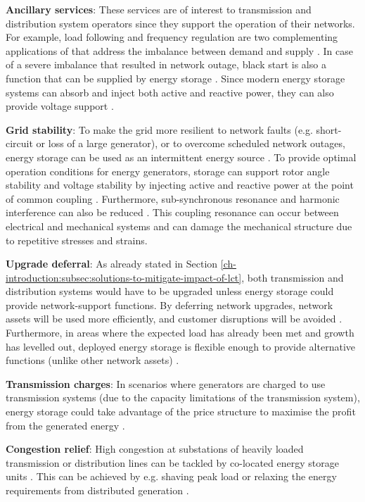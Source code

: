 \textbf{Ancillary services}: These services are of interest to transmission and distribution system operators since they support the operation of their networks.
For example, load following and frequency regulation are two complementing applications of that address the imbalance between demand and supply \cite{Bevrani2011}.
In case of a severe imbalance that resulted in network outage, black start is also a function that can be supplied by energy storage \cite{Cole1995, Kashem2007}.
Since modern energy storage systems can absorb and inject both active and reactive power, they can also provide voltage support \cite{Kulkarni2005}.

\textbf{Grid stability}: To make the grid more resilient to network faults (e.g. short-circuit or loss of a large generator), or to overcome scheduled network outages, energy storage can be used as an intermittent energy source \cite{Kundur1993}.
To provide optimal operation conditions for energy generators, storage can support rotor angle stability and voltage stability by injecting active and reactive power at the point of common coupling \cite{Chakraborty2012, Kolluri2002}.
Furthermore, sub-synchronous resonance and harmonic interference can also be reduced \cite{Wang1994}.
This coupling resonance can occur between electrical and mechanical systems and can damage the mechanical structure due to repetitive stresses and strains.

\textbf{Upgrade deferral}: As already stated in Section \ref{ch-introduction:subsec:solutions-to-mitigate-impact-of-lct}, both transmission and distribution systems would have to be upgraded unless energy storage could provide network-support functions.
By deferring network upgrades, network assets will be used more efficiently, and customer disruptions will be avoided \cite{Sayer2007, Eyer2010a}.
Furthermore, in areas where the expected load has already been met and growth has levelled out, deployed energy storage is flexible enough to provide alternative functions (unlike other network assets) \cite{Huff2013}.

\textbf{Transmission charges}: In scenarios where generators are charged to use transmission systems (due to the capacity limitations of the transmission system), energy storage could take advantage of the price structure to maximise the profit from the generated energy \cite{Sayer2007, Leou2012}.

\textbf{Congestion relief}: High congestion at substations of heavily loaded transmission or distribution lines can be tackled by co-located energy storage units \cite{Saez-de-Ibarra2013a, Kulkarni2005}.
This can be achieved by e.g. shaving peak load or relaxing the energy requirements from distributed generation \cite{Reihani2016, Gerards2016d}.

